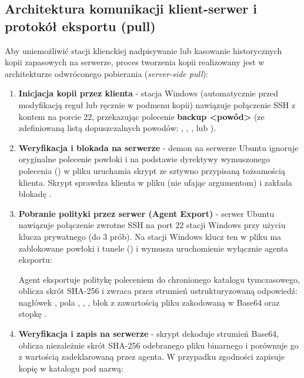 \subsection{Architektura komunikacji klient-serwer i protokół eksportu (pull)}\label{subsec:eksport-konfiguracji}

Aby uniemożliwić stacji klienckiej nadpisywanie lub kasowanie historycznych kopii zapasowych na serwerze, proces tworzenia kopii realizowany jest w architekturze odwróconego pobierania (\textit{server-side pull}):

\begin{enumerate}
    \item \textbf{Inicjacja kopii przez klienta} - stacja Windows (automatycznie przed modyfikacją reguł lub ręcznie w podmenu kopii) nawiązuje połączenie SSH z kontem  na porcie 22, przekazując polecenie \textbf{backup <powód>} (ze zdefiniowaną listą dopuszczalnych powodów: , , ,  lub ).
    \item \textbf{Weryfikacja i blokada na serwerze} - demon  na serwerze Ubuntu ignoruje oryginalne polecenie powłoki i na podstawie dyrektywy wymuszonego polecenia () w pliku  uruchamia skrypt  ze sztywno przypisaną tożsamością klienta. Skrypt sprawdza klienta w pliku  (nie ufając argumentom) i zakłada blokadę .
    \item \textbf{Pobranie polityki przez serwer (Agent Export)} - serwer Ubuntu nawiązuje połączenie zwrotne SSH na port 22 stacji Windows przy użyciu klucza prywatnego  (do 3 prób). Na stacji Windows klucz ten w pliku  ma zablokowane powłoki i tunele () i wymusza uruchomienie wyłącznie agenta eksportu:
    \begin{center}
    \end{center}
    Agent eksportuje politykę poleceniem  do chronionego katalogu tymczasowego, oblicza skrót SHA-256 i zwraca przez strumień  ustrukturyzowaną odpowiedź: nagłówek , pola , , , blok  z zawartością pliku  zakodowaną w Base64 oraz stopkę .
    \item \textbf{Weryfikacja i zapis na serwerze} - skrypt  dekoduje strumień Base64, oblicza niezależnie skrót SHA-256 odebranego pliku binarnego i porównuje go z wartością zadeklarowaną przez agenta. W przypadku zgodności zapisuje kopię w katalogu  pod nazwą:

\end{enumerate}
